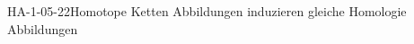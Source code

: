 
\begin{PROP}{HA-1-05-22}{Homotope Ketten Abbildungen induzieren gleiche Homologie Abbildungen}
\end{PROP}
